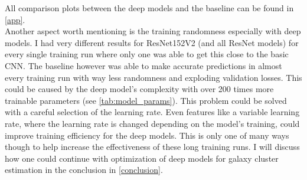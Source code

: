 All comparison plots between the deep models and the baseline can be found in \cref{app}.\\

Another aspect worth mentioning is the training randomness especially with deep models. I had very different results for ResNet152V2 (and all ResNet models) for every single training run where only one was able to get this close to the basic CNN. The baseline however was able to make accurate predictions in almost every training run with way less randomness and exploding validation losses. This could be caused by the deep model's complexity with over 200 times more trainable parameters (see \autoref{tab:model_params}). This problem could be solved with a careful selection of the learning rate. Even features like a variable learning rate, where the learning rate is changed depending on the model's training, could improve training efficiency for the deep models. This is only one of many ways though to help increase the effectiveness of these long training runs. I will discuss how one could continue with optimization of deep models for galaxy cluster estimation in the conclusion in \cref{conclusion}.

